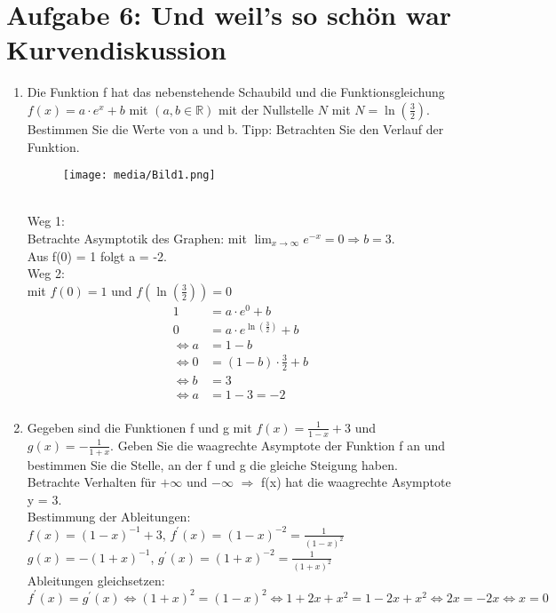 \documentclass[11pt,a4paper, parskip=half ]{report}
\begin{document}
\section*{Aufgabe 6: Und weil's so schön war Kurvendiskussion}
\begin{enumerate}
  \item Die Funktion f hat das nebenstehende Schaubild und die	Funktionsgleichung $f(x) = a\cdot e^x + b$ mit $(a,b \in \mathbb{R})$ mit der Nullstelle $N$ mit $N=\ln(\frac{3}{2})$. Bestimmen Sie die Werte von a und b. Tipp: Betrachten Sie den Verlauf der Funktion.
  \begin{figure}
    \texttt{[image: media/Bild1.png]}
  \end{figure}
  \vspace{20pt}
  \\Weg 1:
  \\Betrachte Asymptotik des Graphen: mit $\lim_{x\rightarrow\infty} e^{-x} = 0 \Rightarrow b = 3$.
  \\Aus f(0) = 1 folgt a = -2.	
  \vspace{20pt}
  \\Weg 2:
  \\mit $f(0)=1$ und $f(\ln(\frac{3}{2}))=0$
  \begin{align*}
    1 &= a\cdot e^0 +b\\
    0 &= a\cdot e^{\ln(\frac{3}{2})} +b\\
    \Leftrightarrow a&=1-b\\
    \Leftrightarrow 0 &= (1-b)\cdot\frac{3}{2} +b\\
    \Leftrightarrow b&= 3\\
    \Leftrightarrow a &= 1-3 = -2\\
  \end{align*}
  \item Gegeben sind die Funktionen f und g mit $f(x) = \frac{1}{1-x}+3$ und $g(x)=-\frac{1}{1+x}$.	Geben Sie die waagrechte Asymptote der Funktion f an und bestimmen Sie die Stelle, an der f und g  die gleiche Steigung haben.
  \vspace{20pt}
  \\Betrachte Verhalten für $+\infty$ und $-\infty$ $\Rightarrow$ f(x) hat die waagrechte Asymptote y = 3.
  \\Bestimmung der Ableitungen:	
  \\$f(x) = (1-x)^{-1}+3$, $f^{\prime}(x) = (1-x)^{-2} = \frac{1}{(1-x)^2}$ 
  \\$g(x) = -(1+x)^{-1}$, $g^{\prime}(x) = (1+x)^{-2} = \frac{1}{(1+x)^2}$      
  \\Ableitungen gleichsetzen:
  \\$f^{\prime}(x) = g^{\prime}(x)   \Leftrightarrow 	(1+x)^2 = (1-x)^2 \Leftrightarrow 1+2x+x^2 = 1-2x+x^2 \Leftrightarrow 2x = -2x \Leftrightarrow x = 0$	

\end{enumerate}
 
\end{document}
